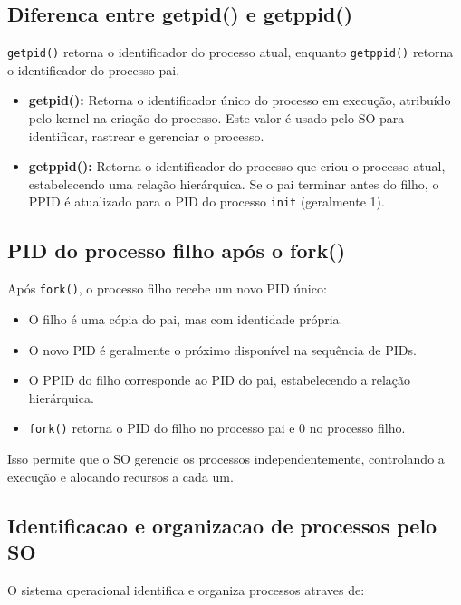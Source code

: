 \documentclass[10pt]{article}
\begin{document}
\subsection{Diferenca entre getpid() e getppid()}

\texttt{getpid()} retorna o identificador do processo atual, enquanto \texttt{getppid()} retorna o identificador do processo pai.

\begin{itemize}\itemsep0em
    \item \textbf{getpid():} Retorna o identificador único do processo em execução, atribuído pelo kernel na criação do processo. Este valor é usado pelo SO para identificar, rastrear e gerenciar o processo.
    
    \item \textbf{getppid():} Retorna o identificador do processo que criou o processo atual, estabelecendo uma relação hierárquica. Se o pai terminar antes do filho, o PPID é atualizado para o PID do processo \texttt{init} (geralmente 1).
\end{itemize}

\subsection{PID do processo filho após o fork()}

Após \texttt{fork()}, o processo filho recebe um novo PID único:

\begin{itemize}\itemsep0em
    \item O filho é uma cópia do pai, mas com identidade própria.
    \item O novo PID é geralmente o próximo disponível na sequência de PIDs.
    \item O PPID do filho corresponde ao PID do pai, estabelecendo a relação hierárquica.
    \item \texttt{fork()} retorna o PID do filho no processo pai e 0 no processo filho.
\end{itemize}

Isso permite que o SO gerencie os processos independentemente, controlando a execução e alocando recursos a cada um.

\subsection{Identificacao e organizacao de processos pelo SO}

O sistema operacional identifica e organiza processos atraves de:
\end{document}

